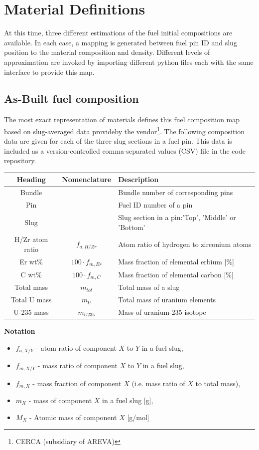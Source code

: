 \documentclass{UWNR_modeling}
\begin{document}
\section{Material Definitions}\label{section:materials}

At this time, three different estimations of the fuel initial compositions are available.  In each case, a mapping is generated between fuel pin ID and slug position to the material composition and density.  Different levels of approximation are invoked by importing different python files each with the same interface to provide this map.

\subsection{As-Built fuel composition}

The most exact representation of materials defines this fuel composition map based on slug-averaged data provideby the vendor\footnote{CERCA (subsidiary of AREVA)}. The following composition data are given for each of the three slug sections in a fuel pin.  This data is included as a version-controlled comma-separated values (CSV) file in the code repository.

\begin{tabular}{|c|c|l|}
\hline
Heading & Nomenclature & Description \\ \hline
Bundle & & Bundle number of corresponding pins\\
Pin & & Fuel ID number of a pin\\
Slug & & Slug section in a pin:'Top', 'Middle' or 'Bottom'\\
H/Zr atom ratio & $f_{a,H/Zr}$ & Atom ratio of hydrogen to zirconium atoms\\
Er wt\% & $100 \cdot f_{m,Er}$ & Mass fraction of elemental erbium [\%]\\
C wt\% & $100 \cdot f_{m,C}$ & Mass fraction of elemental carbon [\%]\\
Total mass & $m_{tot}$ & Total mass of a slug\\
Total U mass & $m_{U}$ & Total mass of uranium elements\\
U-235 mass & $m_{U235}$ & Mass of uranium-235 isotope\\ \hline
\end{tabular}

\textbf{Notation}
\begin{itemize}
\item $f_{a,X/Y}$ - atom ratio of component $X$ to $Y$ in a fuel slug,
\item $f_{m,X/Y}$ - mass ratio of component $X$ to $Y$ in a fuel slug,
\item $f_{m,X}$ - mass fraction of component $X$ (i.e. mass ratio of $X$ to total mass),
\item $m_X$ - mass of component $X$ in a fuel slug [g],
\item $M_X$ - Atomic mass of component $X$ [g/mol]
\end{itemize}
\end{document}
